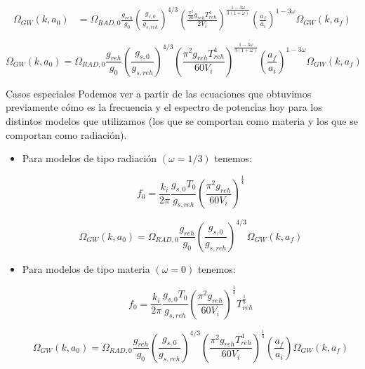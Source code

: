 \begin{equation*}
    \begin{split}
        \Omega_{GW} (k, a_0) &= \Omega_{RAD,0} \frac{g_{reh}}{g_{0}} \left( \frac{g_{s,0}}{g_{s,reh}} \right)^{4/3} \left( \frac{\frac{\pi^2}{30} g_{reh} T_{reh}^4}{2 V_i} \right)^{\frac{1 - 3 \omega}{3 (1 + \omega)}} \left( \frac{a_{f}}{a_{i}} \right)^{1 - 3 \omega} \Omega_{GW} \left( k, a_f \right)
    \end{split}
\end{equation*}

\begin{equation}
    \Omega_{GW} (k, a_0) = \Omega_{RAD,0} \frac{g_{reh}}{g_{0}} \left( \frac{g_{s,0}}{g_{s,reh}} \right)^{4/3} \left( \frac{\pi^2 g_{reh} T_{reh}^4}{60 V_i} \right)^{\frac{1 - 3 \omega}{3 (1 + \omega)}} \left( \frac{a_{f}}{a_{i}} \right)^{1 - 3 \omega} \Omega_{GW} \left( k, a_f \right)
\end{equation}

\begin{infobox}[olive]{Casos especiales}
    Podemos ver a partir de las ecuaciones que obtuvimos previamente cómo es la frecuencia y el espectro de potencias hoy para los distintos modelos que utilizamos (los que se comportan como materia y los que se comportan como radiación).

    \begin{itemize}
        \item Para modelos de tipo radiación $(\omega = 1/3)$ tenemos:
        
            \begin{equation}
                f_0 = \frac{k_i}{2 \pi} \frac{g_{s,0} T_0}{g_{s,reh}} \left( \frac{\pi^2 g_{reh}}{60 V_{i}} \right)^{\frac{1}{4}}
            \end{equation}

            \begin{equation}
                \Omega_{GW} (k, a_0) = \Omega_{RAD,0} \frac{g_{reh}}{g_{0}} \left( \frac{g_{s,0}}{g_{s,reh}} \right)^{4/3} \Omega_{GW} \left( k, a_f \right)
            \end{equation}

        \item Para modelos de tipo materia $(\omega = 0)$ tenemos:
        
            \begin{equation}
                f_0 = \frac{k_i}{2 \pi} \frac{g_{s,0} T_0}{g_{s,reh}} \left( \frac{\pi^2 g_{reh}}{60 V_{i}} \right)^{\frac{1}{3}} T^{\frac{1}{3}}_{reh}
            \end{equation}

            \begin{equation}
                \Omega_{GW} (k, a_0) = \Omega_{RAD,0} \frac{g_{reh}}{g_{0}} \left( \frac{g_{s,0}}{g_{s,reh}} \right)^{4/3} \left( \frac{\pi^2 g_{reh} T_{reh}^4}{60 V_i} \right)^{\frac{1}{3}} \left( \frac{a_{f}}{a_{i}} \right) \Omega_{GW} \left( k, a_f \right)
            \end{equation}
    \end{itemize}
\end{infobox}